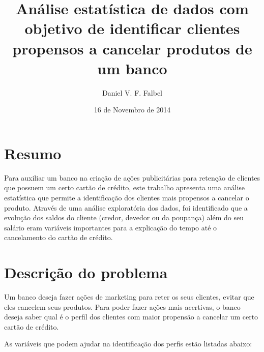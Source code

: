 \documentclass{article}\usepackage[]{graphicx}\usepackage[]{color}
\title{Análise estatística de dados com objetivo de identificar clientes propensos a cancelar produtos de um banco}
\author{Daniel V. F. Falbel}
\date{16 de Novembro de 2014}
\begin{document}
\maketitle

\section*{Resumo}

Para auxiliar um banco na criação de ações publicitárias para retenção de clientes que possuem um certo cartão de crédito, este trabalho apresenta uma análise estatística que permite a identificação dos clientes mais propensos a cancelar o produto. Através de uma análise exploratória dos dados, foi identificado que a evolução dos saldos do cliente (credor, devedor ou da poupança) além do seu salário eram variáveis importantes para a explicação do tempo até o cancelamento do cartão de crédito.

\section{Descrição do problema}

Um banco deseja fazer ações de marketing para reter os seus clientes, evitar que eles cancelem seus produtos. Para poder fazer ações mais acertivas, o banco deseja saber qual é o perfil dos clientes com maior propensão a cancelar um certo cartão de crédito.

As variáveis que podem ajudar na identificação dos perfis estão listadas abaixo: 
\end{document}
